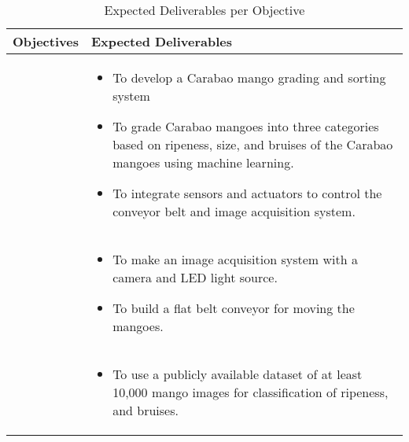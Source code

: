 \begin{table}[!htbp]
	\caption{Expected Deliverables per Objective} 	
	\label{tab:expd1} 
	{\centering \scriptsize
		\begin{tabular}{p{}|p{}}
			\hline 
			\hline 
			\textbf{Objectives} & 
			\textbf{Expected Deliverables}\\ 
			\hline 
			\Paste{GO} &
			\begin{minipage}{0.55\textwidth}
				\vspace{10pt} 
				\begin{itemize}
					\item To develop a Carabao mango grading and sorting system 
					\item To grade Carabao mangoes into three categories based on ripeness, size, and 
					bruises of the Carabao mangoes using machine learning.
					\item To integrate sensors and actuators to control the conveyor belt and image acquisition system.
				\end{itemize}
			\end{minipage} \\ \hline

			\Paste{SO1} & 
			\begin{minipage}{0.55\textwidth}
				\vspace{10pt}
				\begin{itemize}
					\item To make an image acquisition system with a camera and LED light source.
					\item To build a flat belt conveyor for moving the mangoes.
				\end{itemize}
			\end{minipage} \\ \hline

			\Paste{SO2} & 
			\begin{minipage}{0.55\textwidth}
				\vspace{10pt}
				\begin{itemize}
					\item To use a publicly available dataset of at least 10,000 mango images
					 for classification of ripeness, and bruises.
				\end{itemize}
			\end{minipage} \\ \hline
						

\end{tabular}}
\end{table}
